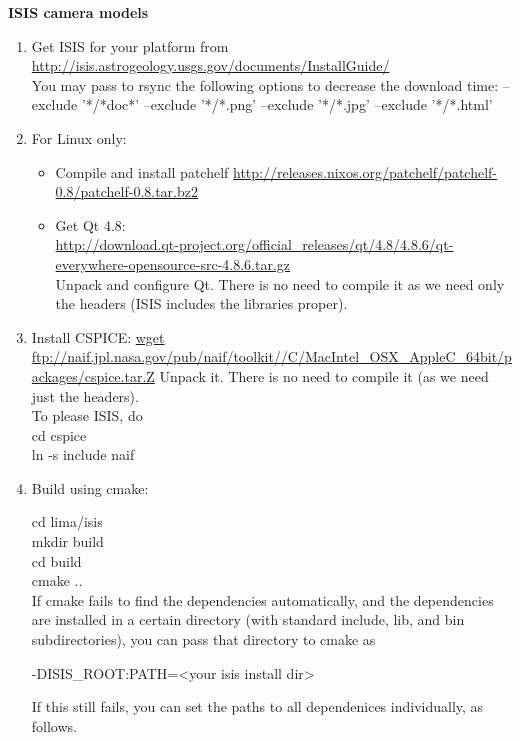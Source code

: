 \documentclass[float=false, crop=false]{standalone}
\begin{document}
{\bf ISIS camera models}
\begin{enumerate}

\item Get ISIS for your platform from \\

   \url {http://isis.astrogeology.usgs.gov/documents/InstallGuide/}\\
 
   You may pass to rsync the following options to decrease the download time:
   --exclude '*/*doc*' --exclude '*/*.png' --exclude '*/*.jpg' --exclude '*/*.html'

\item For Linux only:
\begin{itemize} 
 \item Compile and install patchelf 
   \url{http://releases.nixos.org/patchelf/patchelf-0.8/patchelf-0.8.tar.bz2}
 \item Get Qt 4.8:\\
   \url{http://download.qt-project.org/official_releases/qt/4.8/4.8.6/qt-everywhere-opensource-src-4.8.6.tar.gz}\\
   Unpack and configure Qt. There is no need to compile it as we need
   only the headers (ISIS includes the libraries proper).
\end{itemize}
\item Install CSPICE:
   \url{wget ftp://naif.jpl.nasa.gov/pub/naif/toolkit//C/MacIntel_OSX_AppleC_64bit/packages/cspice.tar.Z}
   Unpack it. There is no need to compile it (as we need just the
   headers). \\
   To please ISIS, do\\   
   cd cspice \\
   ln -s include naif

\item Build using cmake:

   cd lima/isis\\
   mkdir build\\
   cd build\\
   cmake ..\\

If cmake fails to find the dependencies automatically, 
and the dependencies are installed in a certain directory
(with standard include, lib, and bin subdirectories),
you can pass that directory to cmake as 

-DISIS\_ROOT:PATH=<your isis install dir> 

If this still fails, you can set the paths to all dependenices
individually, as follows.


\end{enumerate}
\end{document}
